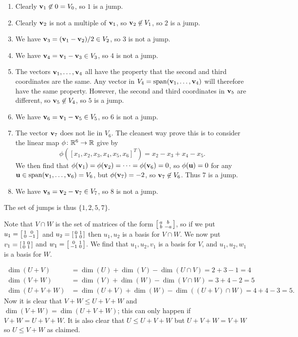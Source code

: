  \begin{enumerate}
  \item Clearly $\mathbf{v}_1\not\in 0=V_0$, so $1$ is a jump.
  \item Clearly $\mathbf{v}_2$ is not a multiple of $\mathbf{v}_1$, so
   $\mathbf{v}_2\not\in V_1$, so $2$ is a jump.
  \item We have $\mathbf{v}_3=(\mathbf{v}_1-\mathbf{v}_2)/2\in V_2$, so $3$ is
   not a jump.
  \item We have $\mathbf{v}_4=\mathbf{v}_1-\mathbf{v}_3\in V_3$, so $4$ is not a jump.
  \item The vectors $\mathbf{v}_1,\dotsc,\mathbf{v}_4$ all have the
   property that the second and third coordinates are the
   same.  Any vector in $V_4=\operatorname{span}(\mathbf{v}_1,\dotsc,\mathbf{v}_4)$ will
   therefore have the same property.  However, the second
   and third coordinates in $\mathbf{v}_5$ are different, so
   $\mathbf{v}_5\not\in V_4$, so $5$ is a jump.
  \item We have $\mathbf{v}_6=\mathbf{v}_1-\mathbf{v}_5\in V_5$, so $6$ is not a jump.
  \item The vector $\mathbf{v}_7$ does not lie in $V_6$.  The
   cleanest way  prove this is to consider the linear map
   $\phi\colon{\mathbb{R}}^6\to{\mathbb{R}}$ give by
   \[ \phi([x_1,x_2,x_3,x_4,x_5,x_6]^T) =
       x_2-x_3+x_4-x_5.
   \]
   We then find that
   $\phi(\mathbf{v}_1)=\phi(\mathbf{v}_2)=\dotsb=\phi(\mathbf{v}_6)=0$, so
   $\phi(\mathbf{u})=0$ for any
   $\mathbf{u}\in\operatorname{span}(\mathbf{v}_1,\dotsc,\mathbf{v}_6)=V_6$, but
   $\phi(\mathbf{v}_7)=-2$, so $\mathbf{v}_7\not\in V_6$.  Thus $7$ is a
   jump.
  \item We have $\mathbf{v}_8=\mathbf{v}_2-\mathbf{v}_7\in V_7$, so $8$ is not a jump.
 \end{enumerate}
 The set of jumps is thus $\{1,2,5,7\}$.
\EndDeferredSolution

 Note that $V\cap W$ is the set of matrices of the form
 $\left[\begin{smallmatrix} a&b\\ b&-a\end{smallmatrix}\right]$, so if we put
 $u_1=\left[\begin{smallmatrix} 1&0\\0&-1\end{smallmatrix}\right]$ and $u_2=\left[\begin{smallmatrix} 0&1\\1&0\end{smallmatrix}\right]$ then
 $u_1,u_2$ is a basis for $V\cap W$.  We now put $v_1=\left[\begin{smallmatrix}
 1&0\\0&1\end{smallmatrix}\right]$ and $w_1=\left[\begin{smallmatrix} 0&1\\-1&0\end{smallmatrix}\right]$.  We find that
 $u_1,u_2,v_1$ is a basis for $V$, and $u_1,u_2,w_1$ is a
 basis for $W$.
\EndDeferredSolution

 \begin{align*}
  \dim(U+V) &= \dim(U)+\dim(V)-\dim(U\cap V)=2+3-1=4\\
  \dim(V+W) &= \dim(V)+\dim(W)-\dim(V\cap W)=3+4-2=5\\
  \dim(U+V+W) &= \dim(U+V)+\dim(W)-\dim((U+V)\cap W)
               = 4+4-3=5.
 \end{align*}
 Now it is clear that $V+W\leq U+V+W$ and
 $\dim(V+W)=\dim(U+V+W)$; this can only happen if
 $V+W=U+V+W$.  It is also clear that $U\leq U+V+W$ but
 $U+V+W=V+W$ so $U\leq V+W$ as claimed.
\EndDeferredSolution

